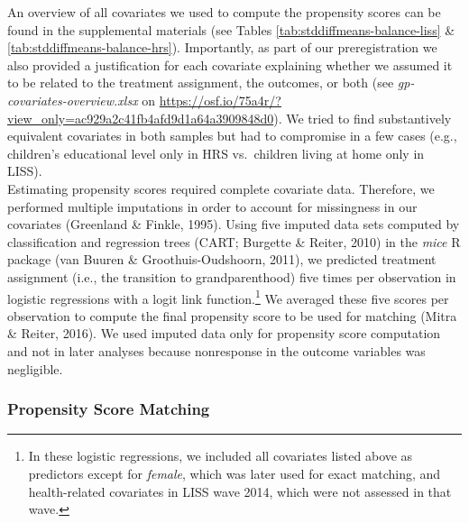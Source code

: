 \documentclass[
  english,
  man,floatsintext]{apa7}
\begin{document}
An overview of all covariates we used to compute the propensity scores can be found in the supplemental materials (see Tables \ref{tab:stddiffmeans-balance-liss} \& \ref{tab:stddiffmeans-balance-hrs}). Importantly, as part of our preregistration we also provided a justification for each covariate explaining whether we assumed it to be related to the treatment assignment, the outcomes, or both (see \emph{gp-covariates-overview.xlsx} on \url{https://osf.io/75a4r/?view_only=ac929a2c41fb4afd9d1a64a3909848d0}). We tried to find substantively equivalent covariates in both samples but had to compromise in a few cases (e.g., children's educational level only in HRS vs.~children living at home only in LISS).\\
Estimating propensity scores required complete covariate data. Therefore, we performed multiple imputations in order to account for missingness in our covariates (Greenland \& Finkle, 1995). Using five imputed data sets computed by classification and regression trees (CART; Burgette \& Reiter, 2010) in the \emph{mice} R package (van Buuren \& Groothuis-Oudshoorn, 2011), we predicted treatment assignment (i.e., the transition to grandparenthood) five times per observation in logistic regressions with a logit link function.\footnote{In these logistic regressions, we included all covariates listed above as predictors except for \emph{female}, which was later used for exact matching, and health-related covariates in LISS wave 2014, which were not assessed in that wave.} We averaged these five scores per observation to compute the final propensity score to be used for matching (Mitra \& Reiter, 2016). We used imputed data only for propensity score computation and not in later analyses because nonresponse in the outcome variables was negligible.

\hypertarget{propensity-score-matching}{%
\subsubsection{Propensity Score Matching}\label{propensity-score-matching}}
\end{document}
